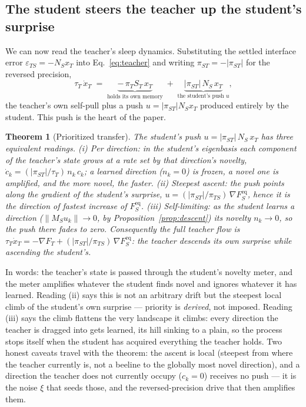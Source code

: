 \documentclass[10pt,letterpaper]{article}
\theoremstyle{plain}
\newtheorem{theorem}{Theorem}
\theoremstyle{remark}
\newcommand{\eps}{\varepsilon}
\newcommand{\xT}{x_T}
\newcommand{\MS}{M_S}
\newcommand{\ST}{S_T}
\newcommand{\NS}{N_S}
\newcommand{\FSeq}{F_S^{\mathrm{eq}}}
\newcommand{\FT}{F_T}
\newcommand{\epsTS}{\eps_{TS}}
\newcommand{\piT}{\pi_T}
\newcommand{\piTS}{\pi_{TS}}
\newcommand{\piST}{\pi_{ST}}
\newcommand{\tauT}{\tau_T}
\begin{document}
\subsection{The student steers the teacher up the student's surprise}
We can now read the teacher's sleep dynamics. Substituting the settled interface error
$\epsTS=-\NS\xT$ into Eq.~\eqref{eq:teacher} and writing $\piST=-|\piST|$ for the reversed precision,
\begin{equation}
\label{eq:teacher_reduced}
\tauT\,\dot\xT \;=\; \underbrace{-\,\piT \ST\,\xT}_{\text{holds its own memory}}
\;+\; \underbrace{|\piST|\,\NS\,\xT}_{\text{the student's push } u},
\end{equation}
the teacher's own self-pull plus a push $u=|\piST|\NS\xT$ produced entirely by the student. This push
is the heart of the paper.

\begin{theorem}[Prioritized transfer]
\label{thm:prioritized}
The student's push $u=|\piST|\,\NS\,\xT$ has three equivalent readings.
\emph{(i) Per direction:} in the student's eigenbasis each component of the teacher's state grows at a
rate set by that direction's novelty, $\dot c_k=(|\piST|/\tauT)\,n_k\,c_k$; a learned direction
($n_k=0$) is frozen, a novel one is amplified, and the more novel, the faster.
\emph{(ii) Steepest ascent:} the push points along the gradient of the student's surprise,
$u=(|\piST|/\piTS)\,\nabla\FSeq$, hence it is the direction of fastest increase of $\FSeq$.
\emph{(iii) Self-limiting:} as the student learns a direction ($\|\MS u_k\|\!\to\!0$, by
Proposition~\ref{prop:descent}) its novelty $n_k\!\to\!0$, so the push there fades to zero.
Consequently the full teacher flow is
$\tauT\dot\xT=-\nabla\FT+(|\piST|/\piTS)\,\nabla\FSeq$: the teacher descends its own surprise while
ascending the student's.
\end{theorem}

In words: the teacher's state is passed through the student's novelty meter, and the meter amplifies
whatever the student finds novel and ignores whatever it has learned. Reading (ii) says this is not an
arbitrary drift but the steepest local climb of the student's own surprise --- priority is
\emph{derived}, not imposed. Reading (iii) says the climb flattens the very landscape it climbs: every
direction the teacher is dragged into gets learned, its hill sinking to a plain, so the process stops
itself when the student has acquired everything the teacher holds. Two honest caveats travel with the
theorem: the ascent is local (steepest from where the teacher currently is, not a beeline to the globally
most novel direction), and a direction the teacher does not currently occupy ($c_k=0$) receives no push
--- it is the noise $\xi$ that seeds those, and the reversed-precision drive that then amplifies them.
\end{document}
